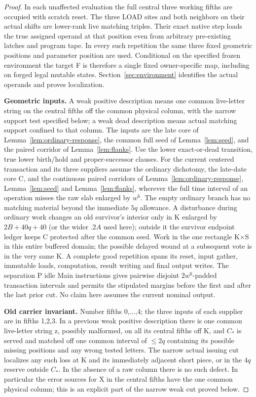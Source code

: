 \begin{proof}
In each unaffected evaluation the full central three working fifths are occupied with scratch reset. The three LOAD sites and both neighbors on their actual shifts are lower-rank live matching triples. Their exact native step loads the true assigned operand at that position even from arbitrary pre-existing latches and program tape. In every such repetition the same three fixed geometric positions and parameter position are used. Conditional on the specified frozen environment the target F is therefore a single fixed owner-specific map, including on forged legal mutable states. Section~\ref{sec:environment} identifies the actual operands and proves localization.

\textbf{Geometric inputs.} A weak positive description means one common live-letter string on the central fifths off the common physical column, with the narrow support test specified below; a weak dead description means actual matching support confined to that column. The inputs are the late core of Lemma~\ref{lem:ordinary-response}, the common full seed of Lemma~\ref{lem:seed}, and the paired corridor of Lemma~\ref{lem:flanks}. Use the lower exact-or-dead transition, true lower birth/hold and proper-successor clauses. For the current centered transaction and its three suppliers assume the ordinary dichotomy, the late-date core C, and the continuous paired corridors of Lemma~\ref{lem:ordinary-response}, Lemma~\ref{lem:seed} and Lemma~\ref{lem:flanks}, wherever the full time interval of an operation misses the raw slab enlarged by \(w^6\). The empty ordinary branch has no matching material beyond the immediate \(5q\) allowance. A disturbance during ordinary work changes an old survivor's interior only in K enlarged by \(2B+40q+40\) (or the wider \(.2A\) used here); outside it the survivor endpoint ledger keeps C protected after the common seed. Work in the one rectangle K\(\times\)S in this entire buffered domain; the possible delayed wound at a subsequent vote is in the very same K. A complete good repetition spans its reset, input gather, immutable loads, computation, result writing and final output writes. The separation P idle Main instructions gives pairwise disjoint \(2w^6\)-padded transaction intervals and permits the stipulated margins before the first and after the last prior cut. No claim here assumes the current nominal output.

\textbf{Old carrier invariant.} Number fifths 0,...,4; the three inputs of each supplier are in fifths 1,2,3. In a previous weak positive description there is one common live-letter string z, possibly malformed, on all its central fifths off K, and \(C_*\) is served and matched off one common interval of \(\le\)\(2q\) containing its possible missing positions and any wrong tested letters. The narrow actual issuing cut localizes any such loss at K and its immediately adjacent short piece, or in the \(4q\) reserve outside \(C_*\). In the absence of a raw column there is no such defect. In particular the error sources for X in the central fifths have the one common physical column; this is an explicit part of the narrow weak cut proved below.


\end{proof}
